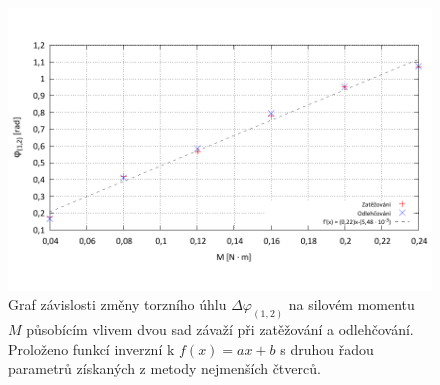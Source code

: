 \documentclass[english]{article}
\begin{document}
	\begin{figure}[h!]
	\begin{center}
	\vspace*{-1.5cm}
	    \includegraphics[width=\linewidth]{../gnuplot/data_g1.pdf}
	    \vspace*{-1.5cm}
	    	\caption{Graf závislosti změny torzního úhlu $\Delta \varphi_{(1,2)}$ na silovém momentu $M$ působícím vlivem dvou sad závaží při zatěžování a odlehčování. Proloženo funkcí inverzní k $f(x) = ax+b$ s druhou řadou parametrů získaných z metody nejmenších čtverců.}
			\label{fig:g_1}
	\end{center}
	\end{figure}
\end{document}
